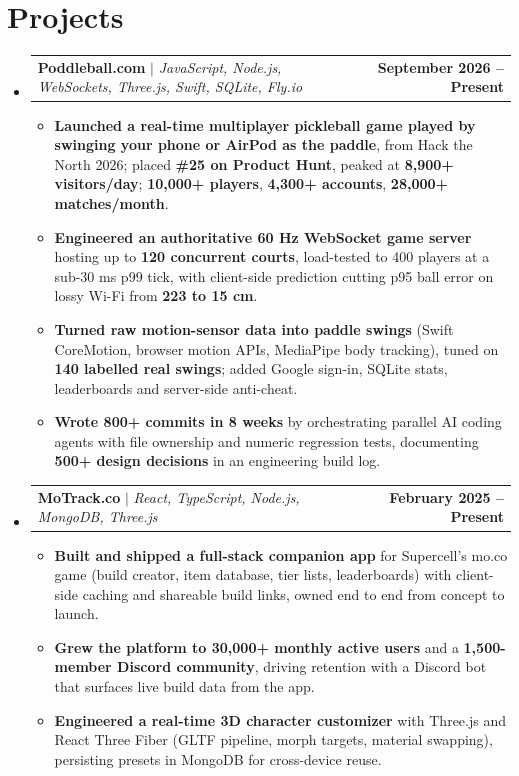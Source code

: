 \documentclass[letterpaper,10pt]{article}
\makeatletter
\newcommand{\resumeItem}[1]{
  \item\small{
    {#1 \vspace{-2pt}}
  }
}
\newcommand{\resumeProjectHeading}[2]{
    \item
    \begin{tabular*}{0.97\textwidth}{l@{\extracolsep{\fill}}r}
      \small#1 & \textbf{\small #2}\\
    \end{tabular*}\vspace{-7pt}
}
\newcommand{\resumeSubHeadingListStart}{\begin{itemize}[leftmargin=0.15in, label={}]}
\newcommand{\resumeSubHeadingListEnd}{\end{itemize}}
\newcommand{\resumeItemListStart}{\begin{itemize}}
\newcommand{\resumeItemListEnd}{\end{itemize}\vspace{-3pt}}
\makeatother
\begin{document}
\section{Projects}
    \resumeSubHeadingListStart
      \resumeProjectHeading
          {\textbf{Poddleball.com} $|$ \emph{JavaScript, Node.js, WebSockets, Three.js, Swift, SQLite, Fly.io}}{September 2026 -- Present}
          \resumeItemListStart
            \resumeItem{\textbf{Launched a real-time multiplayer pickleball game played by swinging your phone or AirPod as the paddle}, from Hack the North 2026; placed \textbf{\#25 on Product Hunt}, peaked at \textbf{8,900+ visitors/day}; \textbf{10,000+ players}, \textbf{4,300+ accounts}, \textbf{28,000+ matches/month}.}
            \resumeItem{\textbf{Engineered an authoritative 60 Hz WebSocket game server} hosting up to \textbf{120 concurrent courts}, load-tested to 400 players at a sub-30 ms p99 tick, with client-side prediction cutting p95 ball error on lossy Wi-Fi from \textbf{223 to 15 cm}.}
            \resumeItem{\textbf{Turned raw motion-sensor data into paddle swings} (Swift CoreMotion, browser motion APIs, MediaPipe body tracking), tuned on \textbf{140 labelled real swings}; added Google sign-in, SQLite stats, leaderboards and server-side anti-cheat.}
            \resumeItem{\textbf{Wrote 800+ commits in 8 weeks} by orchestrating parallel AI coding agents with file ownership and numeric regression tests, documenting \textbf{500+ design decisions} in an engineering build log.}
          \resumeItemListEnd
      \resumeProjectHeading
          {\textbf{MoTrack.co} $|$ \emph{React, TypeScript, Node.js, MongoDB, Three.js}}{February 2025 -- Present}
          \resumeItemListStart
            \resumeItem{\textbf{Built and shipped a full-stack companion app} for Supercell's mo.co game (build creator, item database, tier lists, leaderboards) with client-side caching and shareable build links, owned end to end from concept to launch.}
            \resumeItem{\textbf{Grew the platform to 30,000+ monthly active users} and a \textbf{1,500-member Discord community}, driving retention with a Discord bot that surfaces live build data from the app.}
            \resumeItem{\textbf{Engineered a real-time 3D character customizer} with Three.js and React Three Fiber (GLTF pipeline, morph targets, material swapping), persisting presets in MongoDB for cross-device reuse.}
          \resumeItemListEnd
    \resumeSubHeadingListEnd

\end{document}
